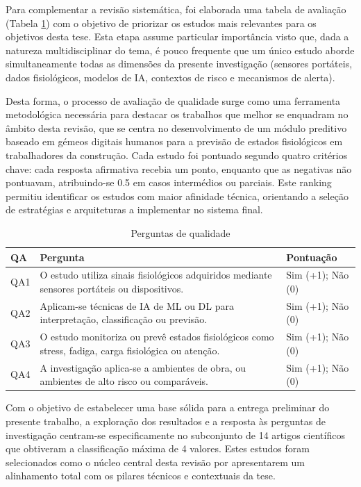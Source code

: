 Para complementar a revisão sistemática, foi elaborada uma tabela de avaliação (Tabela \ref{tab:evaluacion}) com o objetivo de priorizar os estudos mais relevantes para os objetivos desta tese. Esta etapa assume particular importância visto que, dada a natureza multidisciplinar do tema, é pouco frequente que um único estudo aborde simultaneamente todas as dimensões da presente investigação (sensores portáteis, dados fisiológicos, modelos de IA, contextos de risco e mecanismos de alerta).

Desta forma, o processo de avaliação de qualidade surge como uma ferramenta metodológica necessária para destacar os trabalhos que melhor se enquadram no âmbito desta revisão, que se centra no desenvolvimento de um módulo preditivo baseado em gémeos digitais humanos para a previsão de estados fisiológicos em trabalhadores da construção. Cada estudo foi pontuado segundo quatro critérios chave: cada resposta afirmativa recebia um ponto, enquanto que as negativas não pontuavam, atribuindo-se 0.5 em casos intermédios ou parciais. Este ranking permitiu identificar os estudos com maior afinidade técnica, orientando a seleção de estratégias e arquiteturas a implementar no sistema final.

\begin{table}[H]
\caption{Perguntas de qualidade}
\label{tab:evaluacion}
\centering
\begin{tabular}{l p{10cm} l}
\toprule
QA & Pergunta & Pontuação \\
\midrule
QA1 & O estudo utiliza sinais fisiológicos adquiridos mediante sensores portáteis ou dispositivos. & Sim (+1); Não (0) \\
QA2 & Aplicam-se técnicas de IA de ML ou DL para interpretação, classificação ou previsão. & Sim (+1); Não (0) \\
QA3 & O estudo monitoriza ou prevê estados fisiológicos como stress, fadiga, carga fisiológica ou atenção. & Sim (+1); Não (0) \\
QA4 & A investigação aplica-se a ambientes de obra, ou ambientes de alto risco ou comparáveis. & Sim (+1); Não (0) \\
\bottomrule
\end{tabular}
\end{table}

Com o objetivo de estabelecer uma base sólida para a entrega preliminar do presente trabalho, a exploração dos resultados e a resposta às perguntas de investigação centram-se especificamente no subconjunto de 14 artigos científicos que obtiveram a classificação máxima de 4 valores. Estes estudos foram selecionados como o núcleo central desta revisão por apresentarem um alinhamento total com os pilares técnicos e contextuais da tese.

